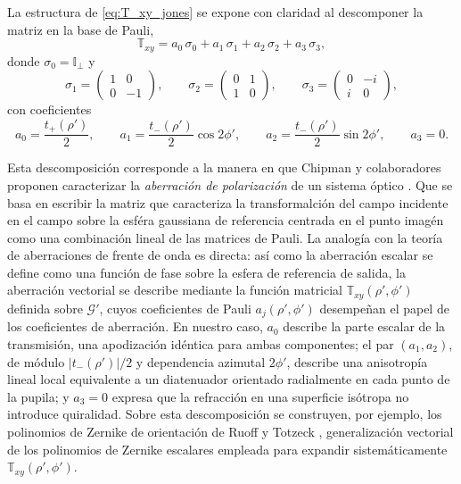 La estructura de \eqref{eq:T_xy_jones} se expone con claridad al descomponer
la matriz en la base de Pauli,
\begin{equation}
\mathbb{T}_{xy}
=
a_0\,\sigma_0 + a_1\,\sigma_1 + a_2\,\sigma_2 + a_3\,\sigma_3,
\label{eq:T_xy_pauli}
\end{equation}
donde $\sigma_0=\mathbb{I}_{\perp}$ y
\begin{equation*}
\sigma_1
=
\begin{pmatrix}
1 & 0 \\ 0 & -1
\end{pmatrix},
\qquad
\sigma_2
=
\begin{pmatrix}
0 & 1 \\ 1 & 0
\end{pmatrix},
\qquad
\sigma_3
=
\begin{pmatrix}
0 & -i \\ i & 0
\end{pmatrix},
\end{equation*}
con coeficientes
\begin{equation}
a_0=\frac{t_+(\rho')}{2},
\qquad
a_1=\frac{t_-(\rho')}{2}\cos 2\phi',
\qquad
a_2=\frac{t_-(\rho')}{2}\sin 2\phi',
\qquad
a_3=0.
\label{eq:T_xy_pauli_coeffs}
\end{equation}

Esta descomposición corresponde a la manera en que Chipman y colaboradores
proponen caracterizar la \emph{aberración de polarización} de un sistema
óptico \cite{mcguire1994}. Que se basa en escribir la matriz que caracteriza la transformalción del campo incidente en el campo sobre la esféra gaussiana de referencia centrada en el punto imagén como una combinación lineal de las matrices de Pauli. La analogía con la teoría de aberraciones de frente
de onda es directa: así como la aberración escalar se define como una función
de fase sobre la esfera de referencia de salida, la aberración vectorial se describe mediante la función
matricial $\mathbb{T}_{xy}(\rho',\phi')$ definida sobre $\mathscr{G}'$, cuyos
coeficientes de Pauli $a_j(\rho',\phi')$ desempeñan el papel de los
coeficientes de aberración. En nuestro caso, $a_0$ describe la parte escalar
de la transmisión, una apodización idéntica para ambas componentes; el par
$(a_1,a_2)$, de módulo $|t_-(\rho')|/2$ y dependencia azimutal $2\phi'$,
describe una anisotropía lineal local equivalente a un diatenuador orientado
radialmente en cada punto de la pupila; y $a_3=0$ expresa que la refracción en
una superficie isótropa no introduce quiralidad. Sobre esta descomposición se
construyen, por ejemplo, los polinomios de Zernike de orientación de Ruoff y
Totzeck \cite{ruoff2009}, generalización vectorial de los polinomios de
Zernike escalares empleada para expandir sistemáticamente
$\mathbb{T}_{xy}(\rho',\phi')$.

